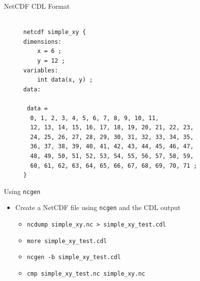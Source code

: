 \documentclass[compress,11pt,xcolor=svgnames,aspectratio=169]{beamer}
\begin{document}
\begin{frame}[fragile]{NetCDF CDL Format}

\begin{figure}
\centering
\begin{varwidth}{\linewidth}
{\footnotesize

\begin{verbatim}

netcdf simple_xy {
dimensions:
	x = 6 ;
	y = 12 ;
variables:
	int data(x, y) ;
data:

 data =
  0, 1, 2, 3, 4, 5, 6, 7, 8, 9, 10, 11,
  12, 13, 14, 15, 16, 17, 18, 19, 20, 21, 22, 23,
  24, 25, 26, 27, 28, 29, 30, 31, 32, 33, 34, 35,
  36, 37, 38, 39, 40, 41, 42, 43, 44, 45, 46, 47,
  48, 49, 50, 51, 52, 53, 54, 55, 56, 57, 58, 59,
  60, 61, 62, 63, 64, 65, 66, 67, 68, 69, 70, 71 ;
}

\end{verbatim}

}
\end{varwidth}
\end{figure}

\end{frame}

\begin{frame}[fragile]{Using \texttt{ncgen}}

\begin{itemize}

  \item Create a NetCDF file using \texttt{ncgen} and the CDL output\\[0.4cm]

    \begin{itemize}
    \setlength\itemsep{0.5cm}

      \item \verb|ncdump simple_xy.nc > simple_xy_test.cdl|
      \item \verb|more simple_xy_test.cdl|
      \item \verb|ncgen -b simple_xy_test.cdl|
      \item \verb|cmp simple_xy_test.nc simple_xy.nc|

    \end{itemize}

\end{itemize}

\end{frame}
\end{document}
